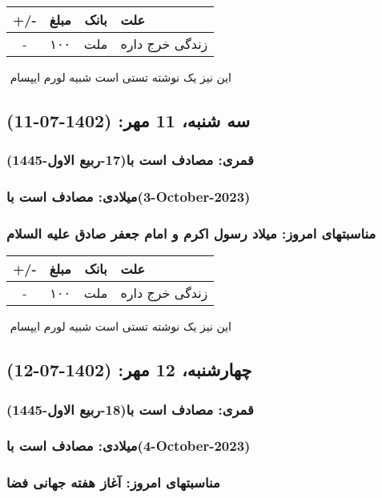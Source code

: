 \documentclass{article}
\newcommand{\rnote}[1]{\marginpar{\textcolor{color}{\StrSubstitute{\##1}{ }{\_}}}}
\newcommand{\myRow}[4]{
    #1 & #2 & #3 & #4 \\ \hline
}
\begin{document}
\begin{tabular}{ | c | c | c | p{5cm} |}
    \hline
    \myRow{ +/- }{مبلغ}{بانک}{علت}
    \myRow{-}{۱۰۰}{ملت}{زندگی خرج داره}
\end{tabular}
\newline
\newline

‌
\rnote{تست}
این نیز یک نوشته تستی است شبیه لورم ایپسام




\newpage
{}
\textcolor{color}{
\section{ سه شنبه، 11 مهر: (1402-07-11) }
\subsubsection*{قمری: مصادف است با(17-ربیع الاول-1445)} 
\subsubsection*{میلادی: مصادف است با(3-October-2023)}
\subsubsection*{مناسبتهای امروز: میلاد رسول اکرم و امام جعفر صادق علیه السلام}
}


\begin{tabular}{ | c | c | c | p{5cm} |}
    \hline
    \myRow{ +/- }{مبلغ}{بانک}{علت}
    \myRow{-}{۱۰۰}{ملت}{زندگی خرج داره}
\end{tabular}
\newline
\newline

‌
\rnote{تست}
این نیز یک نوشته تستی است شبیه لورم ایپسام




\newpage
{}
\textcolor{color}{
\section{ چهارشنبه، 12 مهر: (1402-07-12) }
\subsubsection*{قمری: مصادف است با(18-ربیع الاول-1445)} 
\subsubsection*{میلادی: مصادف است با(4-October-2023)}
\subsubsection*{مناسبتهای امروز: آغاز هفته جهانی فضا}
}
\end{document}
